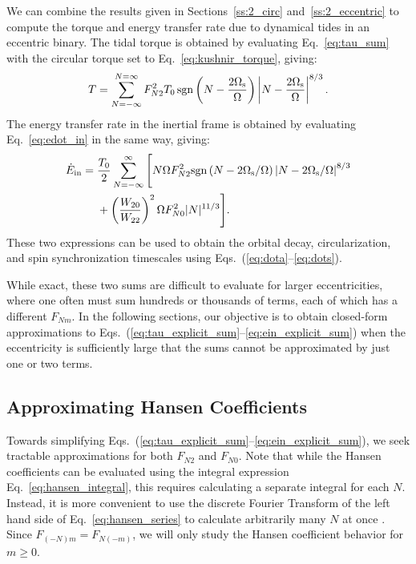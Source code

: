 \documentclass[
        fleqn,
        usenatbib,
    ]{mnras}
\begin{document}
We can combine the results given in Sections~\ref{ss:2_circ}
and~\ref{ss:2_eccentric} to compute the torque and energy transfer rate due to
dynamical tides in an eccentric binary. The tidal torque is obtained by
evaluating Eq.~\eqref{eq:tau_sum} with the circular torque set to
Eq.~\eqref{eq:kushnir_torque}, giving:
\begin{equation}
    T = \sum_{N = -\infty}^{N = \infty} F_{N2}^2 T_0
        \,\mathrm{sgn}\left(N - \frac{2\Omega_{\rm s}}{ \Omega}\right) \left|N -
        \frac{2 \Omega_{\rm s}}{\Omega}\right|^{8/3}.\label{eq:tau_explicit_sum}
\end{equation}
The energy transfer rate in the inertial frame is obtained by evaluating
Eq.~\eqref{eq:edot_in} in the same way, giving:
\begin{align}
    \dot{E}_{\rm in} ={}& \frac{T_0}{2}
        \sum_{N = -\infty}^{\infty} \Bigg[
            N\Omega F_{N2}^2 \mathrm{sgn}\left(N - 2\Omega_{\rm s} / \Omega\right)
                    \left|N - 2 \Omega_{\rm s} / \Omega\right|^{8/3}\nonumber\\
            &+ \left(\frac{W_{20}}{W_{22}}\right)^2 \Omega
                    F_{N0}^2 |N|^{11/3}
            \Bigg].\label{eq:ein_explicit_sum}
\end{align}
These two expressions can be used to obtain the orbital decay, circularization, and
spin synchronization timescales using Eqs.~(\ref{eq:dota}--\ref{eq:dots}).

While exact, these two sums are difficult to evaluate for larger eccentricities,
where one often must sum hundreds or thousands of terms, each of which has a
different $F_{Nm}$. In the following sections, our objective is to obtain
closed-form approximations to
Eqs.~(\ref{eq:tau_explicit_sum}--\ref{eq:ein_explicit_sum}) when the
eccentricity is sufficiently large that the sums cannot be approximated by just
one or two terms.

\subsection{Approximating Hansen Coefficients}\label{ss:hansens}

Towards simplifying
Eqs.~(\ref{eq:tau_explicit_sum}--\ref{eq:ein_explicit_sum}), we seek tractable
approximations for both $F_{N2}$ and $F_{N0}$. Note that while the Hansen
coefficients can be evaluated using the integral expression
Eq.~\eqref{eq:hansen_integral}, this requires calculating a separate integral
for each $N$. Instead, it is more convenient to use the discrete Fourier
Transform of the left hand side of Eq.~\eqref{eq:hansen_series} to calculate
arbitrarily many $N$ at once \citep[as pointed out
by][]{correia2014deformation}. Since $F_{(-N)m} = F_{N(-m)}$, we will only study
the Hansen coefficient behavior for $m \geq 0$.
\end{document}

